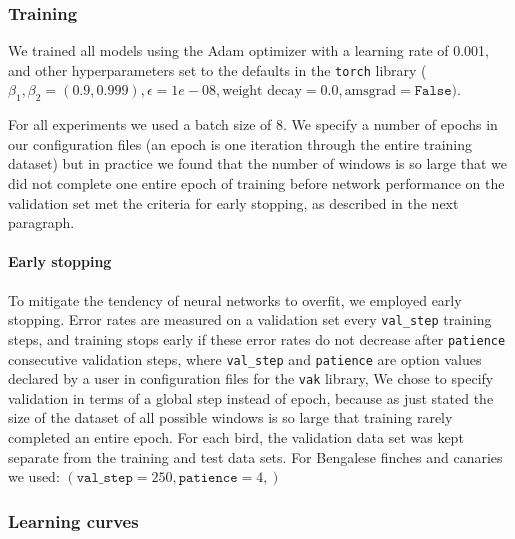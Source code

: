 \documentclass[9pt,lineno]{elife}
\begin{document}
\subsubsection{Training}

We trained all models using the Adam optimizer \cite{kingmaAdamMethodStochastic2014}
with a learning rate of 0.001, and other hyperparameters set to the defaults 
in the \texttt{torch} library ($\beta_1, \beta_2=(0.9, 0.999), 
\epsilon=1e-08, \textrm{weight decay}=0.0, \textrm{amsgrad}=\texttt{False})$.

For all experiments we used a batch size of 8. 
We specify a number of epochs in our configuration files 
(an epoch is one iteration through the entire training dataset) 
but in practice we found that the number of windows is so large 
that we did not complete one entire epoch of training 
before network performance on the validation set 
met the criteria for early stopping, 
as described in the next paragraph.

\paragraph{Early stopping}
To mitigate the tendency of neural networks to overfit, 
we employed early stopping. 
Error rates are measured on a validation set every \texttt{val\_step} training steps,  
and training stops early if these error rates do not decrease after \texttt{patience} consecutive validation steps, 
where \texttt{val\_step} and \texttt{patience} are option values 
declared by a user in configuration files for the \texttt{vak} library, 
We chose to specify validation in terms of a global step instead of epoch, 
because as just stated the size of the dataset of all possible windows is so large 
that training rarely completed an entire epoch.
For each bird, the validation data set was kept separate from the training and test data sets. 
For Bengalese finches and canaries we used: $(\texttt{val\_step}=250, \texttt{patience}=4, )$

\subsubsection{Learning curves}
\label{methods:learning curves}
\end{document}
